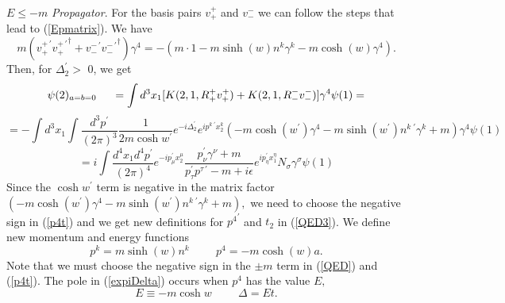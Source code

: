 \documentclass[a4paper,12pt]{article}
\begin{document}
	$E \leq -m$ {\textit{Propagator}}. For the basis pairs $v_{+}^{+}$ and $v_{-}^{-}$ we can follow the steps that lead to (\ref{Epmatrix}). We have
\begin{equation}	\label{Epmatrix2}
m ( v_{+}^{+ \, \prime} {v_{+}^{+ \, \prime }}^{\dagger} + v_{-}^{- \, \prime} {v_{-}^{- \, \prime }}^{\dagger} ) \gamma^{4} = -(m \cdot 1 - m \sinh{(w)} n^{k} \gamma^{k} - m \cosh{(w)} \gamma^{4}) .
\end{equation}
Then, for $\Delta_{2}^{\prime} >$ 0, we get
$$\psi(2)_{a=b=0} \hspace{.5cm} = \int d^3x_{1}[K(2,1,R_{+}^{+}v_{+}^{+}) + K(2,1,R_{-}^{-}v_{-}^{-})] \gamma^{4} \psi(1) = $$
$$
= -\int d^3x_{1}\int \frac{d^3 p^{\prime} }{(2 \pi)^3} \frac{1}{2 m \cosh{w}^{\prime}} e^{-i\Delta_{2}^{\prime}} e^{ip^{k \; \prime}x_{2}^{k}} ( -m \cosh{(w^{\prime})} \gamma^{4} - m \sinh{(w^{\prime})} n^{k \; \prime} \gamma^{k} + m) \gamma^{4} \psi(1)
$$
\begin{equation}	\label{QED3}
= i\int \frac{d^4 x_{1} d^4 p^{\prime} }{(2 \pi)^4} e^{-ip_{\mu}^{\prime}x_{2}^{\mu}}  \frac{ p_{\nu}^{\prime} \gamma^{\nu} + m}{p_{\tau}^{\prime}p^{\tau \, \prime}  - m+i\epsilon} e^{ i p_{\eta}^{\prime} x_{1}^{\eta}} N_{\sigma} \gamma^{\sigma} \psi(1)
\end{equation}
Since the $\cosh{w^{\prime}}$ term is negative in the matrix factor $( -m \cosh{(w^{\prime})} \gamma^{4} - m \sinh{(w^{\prime})} n^{k \; \prime} \gamma^{k} + m),$ we need to choose the negative sign in (\ref{p4t}) and we get new definitions for ${p^{4}}^{\prime}$ and $t_{2}$ in (\ref{QED3}). We define new momentum and energy functions
\begin{equation} \label{pk2}
p^{k} = m \sinh{(w)} n^{k} \hspace{1cm} p^{4} = -m \cosh{(w)} a.
\end{equation}
Note that we must choose the negative sign in the $\pm m$ term in (\ref{QED}) and (\ref{p4t}). The pole in (\ref{expiDelta}) occurs when $p^{4}$ has the value $E,$
\begin{equation}	\label{E2}
E \equiv -m \cosh{w} \hspace{1cm} \Delta = Et.
\end{equation} 
\end{document}
